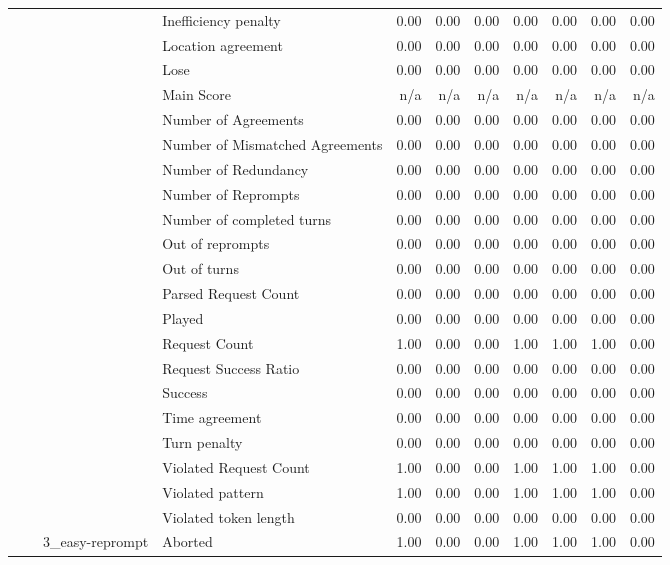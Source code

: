 \begin{tabular}{llllrrrrrrr}
 &  &  & Inefficiency penalty & 0.00 & 0.00 & 0.00 & 0.00 & 0.00 & 0.00 & 0.00 \\
 &  &  & Location agreement & 0.00 & 0.00 & 0.00 & 0.00 & 0.00 & 0.00 & 0.00 \\
 &  &  & Lose & 0.00 & 0.00 & 0.00 & 0.00 & 0.00 & 0.00 & 0.00 \\
 &  &  & Main Score & n/a & n/a & n/a & n/a & n/a & n/a & n/a \\
 &  &  & Number of Agreements & 0.00 & 0.00 & 0.00 & 0.00 & 0.00 & 0.00 & 0.00 \\
 &  &  & Number of Mismatched Agreements & 0.00 & 0.00 & 0.00 & 0.00 & 0.00 & 0.00 & 0.00 \\
 &  &  & Number of Redundancy & 0.00 & 0.00 & 0.00 & 0.00 & 0.00 & 0.00 & 0.00 \\
 &  &  & Number of Reprompts & 0.00 & 0.00 & 0.00 & 0.00 & 0.00 & 0.00 & 0.00 \\
 &  &  & Number of completed turns & 0.00 & 0.00 & 0.00 & 0.00 & 0.00 & 0.00 & 0.00 \\
 &  &  & Out of reprompts & 0.00 & 0.00 & 0.00 & 0.00 & 0.00 & 0.00 & 0.00 \\
 &  &  & Out of turns & 0.00 & 0.00 & 0.00 & 0.00 & 0.00 & 0.00 & 0.00 \\
 &  &  & Parsed Request Count & 0.00 & 0.00 & 0.00 & 0.00 & 0.00 & 0.00 & 0.00 \\
 &  &  & Played & 0.00 & 0.00 & 0.00 & 0.00 & 0.00 & 0.00 & 0.00 \\
 &  &  & Request Count & 1.00 & 0.00 & 0.00 & 1.00 & 1.00 & 1.00 & 0.00 \\
 &  &  & Request Success Ratio & 0.00 & 0.00 & 0.00 & 0.00 & 0.00 & 0.00 & 0.00 \\
 &  &  & Success & 0.00 & 0.00 & 0.00 & 0.00 & 0.00 & 0.00 & 0.00 \\
 &  &  & Time agreement & 0.00 & 0.00 & 0.00 & 0.00 & 0.00 & 0.00 & 0.00 \\
 &  &  & Turn penalty & 0.00 & 0.00 & 0.00 & 0.00 & 0.00 & 0.00 & 0.00 \\
 &  &  & Violated Request Count & 1.00 & 0.00 & 0.00 & 1.00 & 1.00 & 1.00 & 0.00 \\
 &  &  & Violated pattern & 1.00 & 0.00 & 0.00 & 1.00 & 1.00 & 1.00 & 0.00 \\
 &  &  & Violated token length & 0.00 & 0.00 & 0.00 & 0.00 & 0.00 & 0.00 & 0.00 \\
\cline{3-11}
 &  & \multirow[t]{27}{*}{3_easy-reprompt} & Aborted & 1.00 & 0.00 & 0.00 & 1.00 & 1.00 & 1.00 & 0.00 \\

\end{tabular}
